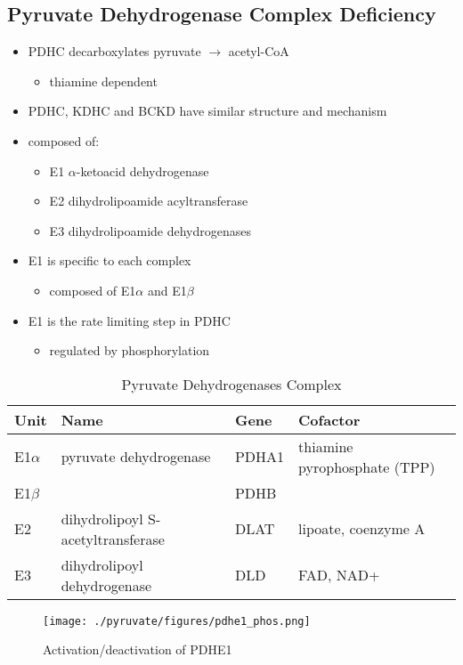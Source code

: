 \documentclass{scrartcl}
\begin{document}
\subsection{Pyruvate Dehydrogenase Complex Deficiency}
\label{sec:org40fb1ca}
\begin{itemize}
\item PDHC decarboxylates pyruvate \(\to\) acetyl-CoA
\begin{itemize}
\item thiamine dependent
\end{itemize}
\item PDHC, KDHC and BCKD have similar structure and mechanism
\item composed of:
\begin{itemize}
\item E1 \(\alpha\)-ketoacid dehydrogenase
\item E2 dihydrolipoamide acyltransferase
\item E3 dihydrolipoamide dehydrogenases
\end{itemize}
\item E1 is specific to each complex
\begin{itemize}
\item composed of E1\(\alpha\) and E1\(\beta\)
\end{itemize}
\item E1 is the rate limiting step in PDHC
\begin{itemize}
\item regulated by phosphorylation
\end{itemize}
\end{itemize}

\begin{table}[htbp]
\caption{\label{tab:org2d1b2b0}
Pyruvate Dehydrogenases Complex}
\centering
\begin{tabular}{llll}
Unit & Name & Gene & Cofactor\\
\hline
E1\(\alpha\) & pyruvate dehydrogenase & PDHA1 & thiamine pyrophosphate (TPP)\\
E1\(\beta\) &  & PDHB & \\
E2 & dihydrolipoyl  S-acetyltransferase & DLAT & lipoate, coenzyme A\\
E3 & dihydrolipoyl dehydrogenase & DLD & FAD, NAD+\\
\end{tabular}
\end{table}



\begin{figure}[htbp]
\centering
\texttt{[image: ./pyruvate/figures/pdhe1\_phos.png]}
\caption[pdhe1]{\label{fig:orgd9dc01c}
Activation/deactivation of PDHE1}
\end{figure}
\end{document}

